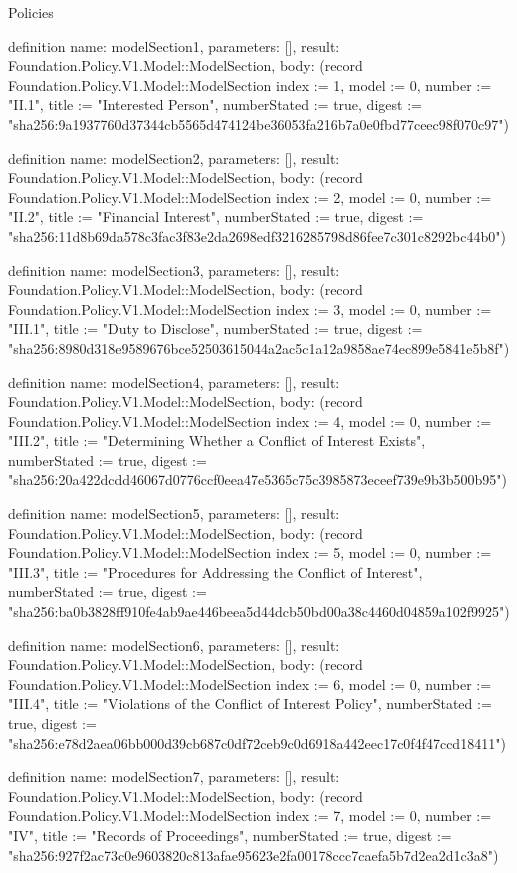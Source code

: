 \begin{lexlean}{Policies}
\begin{semanticmodule}
definition{
  name: modelSection1,
  parameters: [],
  result: Foundation.Policy.V1.Model::ModelSection,
  body: (record Foundation.Policy.V1.Model::ModelSection {index := 1, model := 0, number := "II.1", title := "Interested Person", numberStated := true, digest := "sha256:9a1937760d37344cb5565d474124be36053fa216b7a0e0fbd77ceec98f070c97"})
}

definition{
  name: modelSection2,
  parameters: [],
  result: Foundation.Policy.V1.Model::ModelSection,
  body: (record Foundation.Policy.V1.Model::ModelSection {index := 2, model := 0, number := "II.2", title := "Financial Interest", numberStated := true, digest := "sha256:11d8b69da578c3fac3f83e2da2698edf3216285798d86fee7c301c8292bc44b0"})
}

definition{
  name: modelSection3,
  parameters: [],
  result: Foundation.Policy.V1.Model::ModelSection,
  body: (record Foundation.Policy.V1.Model::ModelSection {index := 3, model := 0, number := "III.1", title := "Duty to Disclose", numberStated := true, digest := "sha256:8980d318e9589676bce52503615044a2ac5c1a12a9858ae74ec899e5841e5b8f"})
}

definition{
  name: modelSection4,
  parameters: [],
  result: Foundation.Policy.V1.Model::ModelSection,
  body: (record Foundation.Policy.V1.Model::ModelSection {index := 4, model := 0, number := "III.2", title := "Determining Whether a Conflict of Interest Exists", numberStated := true, digest := "sha256:20a422dcdd46067d0776ccf0eea47e5365c75c3985873eceef739e9b3b500b95"})
}

definition{
  name: modelSection5,
  parameters: [],
  result: Foundation.Policy.V1.Model::ModelSection,
  body: (record Foundation.Policy.V1.Model::ModelSection {index := 5, model := 0, number := "III.3", title := "Procedures for Addressing the Conflict of Interest", numberStated := true, digest := "sha256:ba0b3828ff910fe4ab9ae446beea5d44dcb50bd00a38c4460d04859a102f9925"})
}

definition{
  name: modelSection6,
  parameters: [],
  result: Foundation.Policy.V1.Model::ModelSection,
  body: (record Foundation.Policy.V1.Model::ModelSection {index := 6, model := 0, number := "III.4", title := "Violations of the Conflict of Interest Policy", numberStated := true, digest := "sha256:e78d2aea06bb000d39cb687c0df72ceb9c0d6918a442eec17c0f4f47ccd18411"})
}

definition{
  name: modelSection7,
  parameters: [],
  result: Foundation.Policy.V1.Model::ModelSection,
  body: (record Foundation.Policy.V1.Model::ModelSection {index := 7, model := 0, number := "IV", title := "Records of Proceedings", numberStated := true, digest := "sha256:927f2ac73c0e9603820c813afae95623e2fa00178ccc7caefa5b7d2ea2d1c3a8"})
}


\end{semanticmodule}
\end{lexlean}
